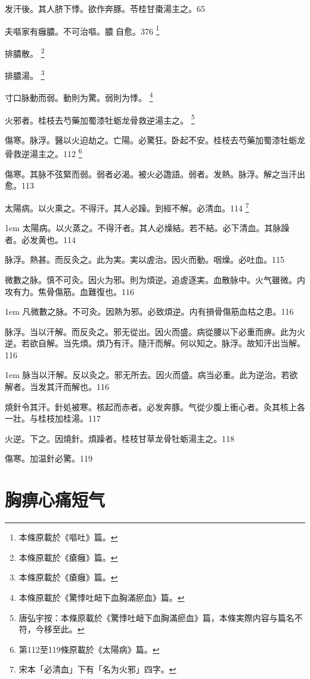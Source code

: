 发汗後。其人脐下悸。欲作奔豚。苓桂甘棗湯主之。65

夫嘔家有癰膿。不可治嘔。膿{\sungtpii 𥁞}自愈。376
	\footnote{本條原載於《嘔吐》篇。}

排膿散。
	\footnote{本條原載於《瘡癰》篇。}

排膿湯。
	\footnote{本條原載於《瘡癰》篇。}

寸口脉動而弱。動則为驚。弱則为悸。
	\footnote{本條原載於《驚悸吐衄下血胸滿瘀血》篇。}

火邪者。桂枝去芍藥加蜀漆牡蛎龙骨救逆湯主之。
	\footnote{唐弘宇按：本條原載於《驚悸吐衄下血胸滿瘀血》篇，本條実際内容与篇名不符，今移至此。}

傷寒。脉浮。醫以火迫劫之。亡陽。{\khaaitp 必}驚狂。卧起不安。桂枝去芍藥加蜀漆牡蛎龙骨救逆湯主之。112
	\footnote{第112至119條原載於《太陽病》篇。}

傷寒。其脉不弦緊而弱{\khaaitp 。弱}者必渴。被火必譫語。{\khaaitp 弱者。发熱。脉浮。解之当汗出愈。}113

太陽病。以火熏之。不得汗。其人必躁。到經不解。必清血。114
	\footnote{宋本「必清血」下有「名为火邪」四字。}
	
\hangindent 1em
太陽病。以火蒸之。不得汗者。其人必燥結。若不結。必下清血。其脉躁者。必发黄也。{\gaoben}114

脉浮。熱甚。而反灸之。此为実。実以虗治。因火而動。咽燥。必吐血。115

微數之脉。慎不可灸。因火为邪。則为煩逆。追虗逐実。血散脉中。火气雖微。内攻有力。焦骨傷筋。血難復也。116

\hangindent 1em
凡微數之脉。不可灸。因熱为邪。必致煩逆。内有損骨傷筋血枯之患。{\gaoben}116

脉浮。当以汗解。而反灸之。邪无從出。因火而盛。病從腰以下必重而痹。此为火逆。若欲自解。当先煩。煩乃有汗。隨汗而解。何以知之。脉浮。故知汗出当解。116

\hangindent 1em
脉当以汗解。反以灸之。邪无所去。因火而盛。病当必重。此为逆治。若欲解者。当发其汗而解也。{\gaoben}116

燒針令其汗。針処被寒。核起而赤者。必发奔豚。气從少腹上衝心者。灸其核上各一壯。与桂枝加桂湯。117

火逆。下之。因燒針。煩躁者。桂枝甘草龙骨牡蛎湯主之。118

傷寒。加温針必驚。119

\chapter{胸痹心痛短气}

